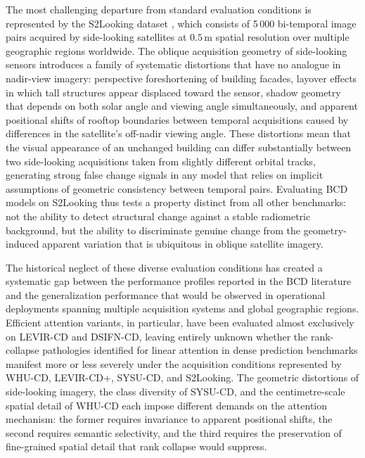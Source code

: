 The most challenging departure from standard evaluation conditions is represented by the S2Looking dataset \cite{ShenS2Looking2021}, which consists of 5\,000 bi-temporal image pairs acquired by side-looking satellites at $0.5\,\mathrm{m}$ spatial resolution over multiple geographic regions worldwide. The oblique acquisition geometry of side-looking sensors introduces a family of systematic distortions that have no analogue in nadir-view imagery: perspective foreshortening of building facades, layover effects in which tall structures appear displaced toward the sensor, shadow geometry that depends on both solar angle and viewing angle simultaneously, and apparent positional shifts of rooftop boundaries between temporal acquisitions caused by differences in the satellite's off-nadir viewing angle. These distortions mean that the visual appearance of an unchanged building can differ substantially between two side-looking acquisitions taken from slightly different orbital tracks, generating strong false change signals in any model that relies on implicit assumptions of geometric consistency between temporal pairs. Evaluating \ac{BCD} models on S2Looking thus tests a property distinct from all other benchmarks: not the ability to detect structural change against a stable radiometric background, but the ability to discriminate genuine change from the geometry-induced apparent variation that is ubiquitous in oblique satellite imagery.

The historical neglect of these diverse evaluation conditions has created a systematic gap between the performance profiles reported in the \ac{BCD} literature and the generalization performance that would be observed in operational deployments spanning multiple acquisition systems and global geographic regions. Efficient attention variants, in particular, have been evaluated almost exclusively on LEVIR-CD and DSIFN-CD, leaving entirely unknown whether the rank-collapse pathologies identified for linear attention in dense prediction benchmarks manifest more or less severely under the acquisition conditions represented by WHU-CD, LEVIR-CD+, SYSU-CD, and S2Looking. The geometric distortions of side-looking imagery, the class diversity of SYSU-CD, and the centimetre-scale spatial detail of WHU-CD each impose different demands on the attention mechanism: the former requires invariance to apparent positional shifts, the second requires semantic selectivity, and the third requires the preservation of fine-grained spatial detail that rank collapse would suppress.


